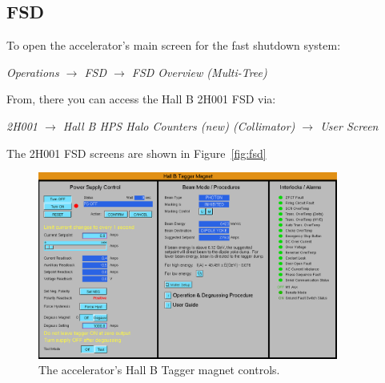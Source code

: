 \documentclass[amsmath,amssymb,notitlepage,11pt]{revtex4}
\begin{document}
    \subsection{FSD}
To open the accelerator's main screen for the fast shutdown system:
\begin{center}{\em Operations $\to$ FSD $\to$ FSD Overview (Multi-Tree)}\end{center}
From, there you can access the Hall B 2H001 FSD via:  
\begin{center}{\em 2H001 $\to$ Hall B HPS Halo Counters (new) (Collimator) $\to$ User Screen}\end{center}
The 2H001 FSD screens are shown in Figure~\ref{fig:fsd}
\begin{figure}[htbp]\centering
  \includegraphics[width=0.88\textwidth]{pics/tagger}
  \caption{The accelerator's Hall B Tagger magnet controls.\label{fig:tagger}}
\end{figure}
\end{document}
